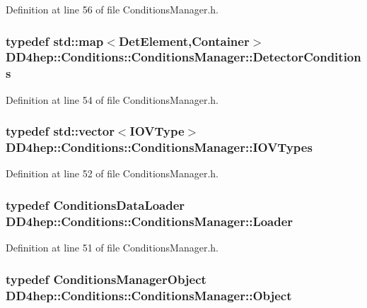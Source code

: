 Definition at line 56 of file ConditionsManager.h.\hypertarget{class_d_d4hep_1_1_conditions_1_1_conditions_manager_a27022fcc820a7fd132d3f74ed4ed6c1f}{
\subsubsection[{DetectorConditions}]{\setlength{\rightskip}{0pt plus 5cm}typedef std::map$<${\bf DetElement},{\bf Container}$>$ {\bf DD4hep::Conditions::ConditionsManager::DetectorConditions}}}
\label{class_d_d4hep_1_1_conditions_1_1_conditions_manager_a27022fcc820a7fd132d3f74ed4ed6c1f}


Definition at line 54 of file ConditionsManager.h.\hypertarget{class_d_d4hep_1_1_conditions_1_1_conditions_manager_aad65a81edf6d4cf81f33f660537587f8}{
\subsubsection[{IOVTypes}]{\setlength{\rightskip}{0pt plus 5cm}typedef std::vector$<${\bf IOVType}$>$ {\bf DD4hep::Conditions::ConditionsManager::IOVTypes}}}
\label{class_d_d4hep_1_1_conditions_1_1_conditions_manager_aad65a81edf6d4cf81f33f660537587f8}


Definition at line 52 of file ConditionsManager.h.\hypertarget{class_d_d4hep_1_1_conditions_1_1_conditions_manager_acd0f1e242240cc1c07a0d029a716a718}{
\subsubsection[{Loader}]{\setlength{\rightskip}{0pt plus 5cm}typedef {\bf ConditionsDataLoader} {\bf DD4hep::Conditions::ConditionsManager::Loader}}}
\label{class_d_d4hep_1_1_conditions_1_1_conditions_manager_acd0f1e242240cc1c07a0d029a716a718}


Definition at line 51 of file ConditionsManager.h.\hypertarget{class_d_d4hep_1_1_conditions_1_1_conditions_manager_ae865f49d144d8ba5be9eec3e1d8fec94}{
\subsubsection[{Object}]{\setlength{\rightskip}{0pt plus 5cm}typedef {\bf ConditionsManagerObject} {\bf DD4hep::Conditions::ConditionsManager::Object}}}
\label{class_d_d4hep_1_1_conditions_1_1_conditions_manager_ae865f49d144d8ba5be9eec3e1d8fec94}



